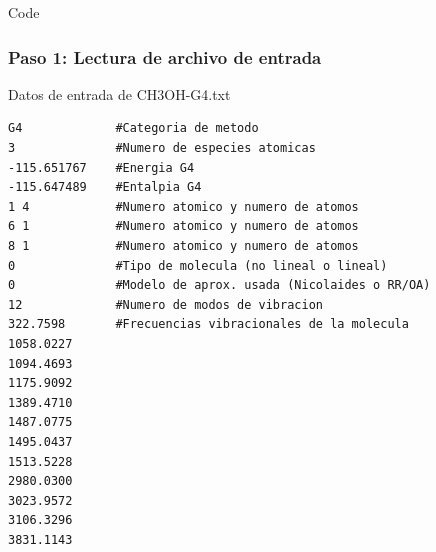 \documentclass{beamer}
\begin{document}
\begin{frame}[fragile]{Code}
\frametitle{Paso 1: Lectura de archivo de entrada}

\begin{block}{Datos de entrada de CH3OH-G4.txt}
\begin{lstlisting}
G4             #Categoria de metodo
3              #Numero de especies atomicas 
-115.651767    #Energia G4 
-115.647489    #Entalpia G4 
1 4            #Numero atomico y numero de atomos
6 1            #Numero atomico y numero de atomos
8 1            #Numero atomico y numero de atomos
0              #Tipo de molecula (no lineal o lineal)
0              #Modelo de aprox. usada (Nicolaides o RR/OA)
12             #Numero de modos de vibracion
322.7598       #Frecuencias vibracionales de la molecula
1058.0227    
1094.4693
1175.9092
1389.4710
1487.0775
1495.0437
1513.5228
2980.0300
3023.9572
3106.3296
3831.1143
\end{lstlisting}
\end{block}
\end{frame}
\end{document}
